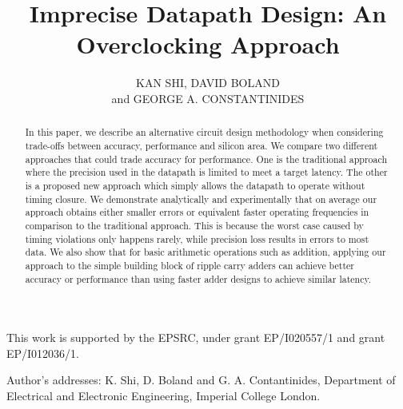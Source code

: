 \documentclass[prodmode,acmtrets]{acmsmall} %
\begin{document}

\title{Imprecise Datapath Design: An Overclocking Approach}
\author{KAN SHI, DAVID BOLAND\\
and GEORGE A. CONSTANTINIDES
}
\vspace{-5ex}


\begin{abstract}
In this paper, we describe an alternative circuit design methodology when considering trade-offs between accuracy, performance and silicon area. We compare two different approaches that could trade accuracy for performance. One is the traditional approach where the precision used in the datapath is limited to meet a target latency. The other is a proposed new approach which simply allows the datapath to operate without timing closure. We demonstrate analytically and experimentally that on average our approach obtains either smaller errors or equivalent faster operating frequencies in comparison to the traditional approach. This is because the worst case caused by timing violations only happens rarely, while precision loss results in errors to most data. We also show that for basic arithmetic operations such as addition, applying our approach to the simple building block of ripple carry adders can achieve better accuracy or performance than using faster adder designs to achieve similar latency.
\end{abstract}





\begin{bottomstuff}
This work is supported by the EPSRC, under
grant EP/I020557/1 and grant EP/I012036/1.

Author's addresses: K. Shi, D. Boland {and} G. A. Contantinides,
Department of Electrical and Electronic Engineering,
Imperial College London.
\end{bottomstuff}
\end{document}

